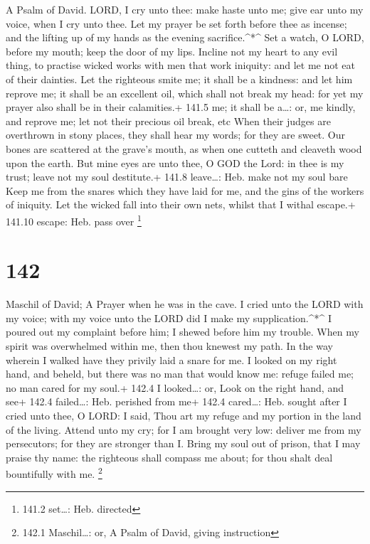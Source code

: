 A Psalm of David.  LORD, I cry unto thee: make haste unto
me; give ear unto my voice, when I cry unto thee.  Let my
prayer be set forth before thee as incense; and the lifting up of my
hands as the evening sacrifice.\^{}*\^{}  Set a watch, O
LORD, before my mouth; keep the door of my lips.  Incline
not my heart to any evil thing, to practise wicked works with men that
work iniquity: and let me not eat of their dainties.  Let
the righteous smite me; it shall be a kindness: and let him reprove me;
it shall be an excellent oil, which shall not break my head: for yet my
prayer also shall be in their calamities.+ 141.5 me; it shall be
a\ldots: or, me kindly, and reprove me; let not their precious oil
break, etc  When their judges are overthrown in stony
places, they shall hear my words; for they are sweet.  Our
bones are scattered at the grave's mouth, as when one cutteth and
cleaveth wood upon the earth.  But mine eyes are unto thee,
O GOD the Lord: in thee is my trust; leave not my soul destitute.+ 141.8
leave\ldots: Heb. make not my soul bare  Keep me from the
snares which they have laid for me, and the gins of the workers of
iniquity.  Let the wicked fall into their own nets, whilst
that I withal escape.+ 141.10 escape: Heb. pass over \footnote{141.2
  set\ldots: Heb. directed}

\hypertarget{section-142}{%
\section{142}\label{section-142}}

Maschil of David; A Prayer when he was in the cave.  I cried
unto the LORD with my voice; with my voice unto the LORD did I make my
supplication.\^{}*\^{}  I poured out my complaint before
him; I shewed before him my trouble.  When my spirit was
overwhelmed within me, then thou knewest my path. In the way wherein I
walked have they privily laid a snare for me.  I looked on
my right hand, and beheld, but there was no man that would know me:
refuge failed me; no man cared for my soul.+ 142.4 I looked\ldots: or,
Look on the right hand, and see+ 142.4 failed\ldots: Heb. perished from
me+ 142.4 cared\ldots: Heb. sought after  I cried unto thee,
O LORD: I said, Thou art my refuge and my portion in the land of the
living.  Attend unto my cry; for I am brought very low:
deliver me from my persecutors; for they are stronger than I.
 Bring my soul out of prison, that I may praise thy name:
the righteous shall compass me about; for thou shalt deal bountifully
with me. \footnote{142.1 Maschil\ldots: or, A Psalm of David, giving
  instruction}


